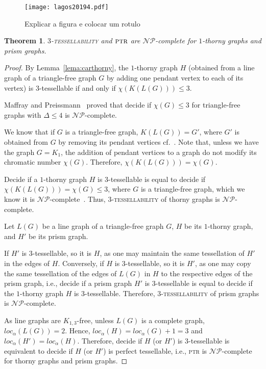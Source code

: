 \documentclass[9pt]{entcs} \usepackage{entcsmacro}
\newtheorem{teo}{Theorem}[section]
\begin{document}
\begin{figure}
\centering
     \texttt{[image: lagos20194.pdf]}
     \caption{ Explicar a figura e colocar um rotulo \label{fig:prism}}
\end{figure}


\begin{teo}
\textsc{$3$-tessellability} and $\textsc{ptr}$ are $\mathcal{NP}$-complete for $1$-thorny graphs and prism graphs.
\label{teo:npcthornyprism}
\end{teo}
\begin{proof}

By Lemma~\ref{lema:carthorny}, the $1$-thorny graph $H$ (obtained from a line graph of a triangle-free graph $G$ by adding one pendant vertex to each of its vertex) is $3$-tessellable if and only if $\chi(K(L(G)))\leq 3$.

Maffray and Preissmann~\cite{ArMaffray} proved that decide if $\chi(G) \leq 3$ for triangle-free graphs with $\Delta \leq 4$ is $\mathcal{NP}$-complete.

We know that if $G$ is a triangle-free graph, $K(L(G)) = G'$, where $G'$ is obtained from $G$ by removing its pendant vertices cf.~\cite{CNMAC}.
Note that, unless we have the graph $G=K_1$, the addition of pendant vertices to a graph do not modify its chromatic number $\chi(G)$.
Therefore, $\chi(K(L(G))) = \chi(G)$.

Decide if a $1$-thorny graph $H$ is $3$-tessellable is equal to decide if $\chi(K(L(G))) = \chi(G) \leq 3$, where $G$ is a triangle-free graph, which we know it is $\mathcal{NP}$-complete~\cite{ArMaffray}.
Thus, \textsc{$3$-tessellability} of thorny graphs is $\mathcal{NP}$-complete.

Let $L(G)$ be a line graph of a triangle-free graph $G$, $H$ be its $1$-thorny graph, and $H'$ be its prism graph.

If $H'$ is $3$-tessellable, so it is $H$, as one may maintain the same tessellation of $H'$ in the edges of $H$.
Conversely, if $H$ is $3$-tessellable, so it is $H'$, as one may copy the same tessellation of the edges of $L(G)$ in $H$ to the respective edges of the prism graph,
i.e., decide if a prism graph $H'$ is $3$-tessellable is equal to decide if the $1$-thorny graph $H$ is $3$-tessellable.
Therefore, \textsc{$3$-tessellability} of prism graphs is $\mathcal{NP}$-complete.

As line graphs are $K_{1,3}$-free, unless $L(G)$ is a complete graph, $loc_\alpha(L(G))=2$.
Hence, $loc_\alpha(H)= loc_\alpha(G)+1 = 3$ and  $loc_\alpha(H')= loc_\alpha(H)$.
Therefore, decide if $H$ (or $H'$) is $3$-tessellable is equivalent to decide if $H$ (or $H'$) is perfect tessellable, i.e., \textsc{ptr} is $\mathcal{NP}$-complete for thorny graphs and prism graphs.
\end{proof}
\end{document}
